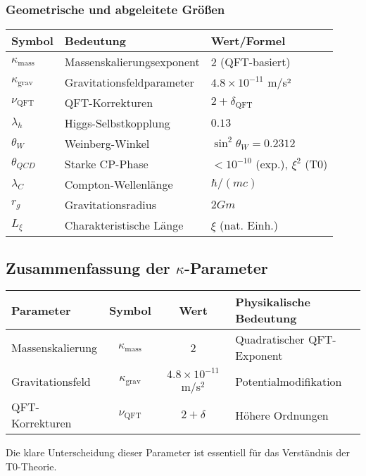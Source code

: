 \documentclass[12pt,a4paper]{article}
\begin{document}
	\subsubsection{Geometrische und abgeleitete Größen}
	\begin{longtable}{lll}
		\toprule
		\textbf{Symbol} & \textbf{Bedeutung} & \textbf{Wert/Formel} \\
		\midrule
		$\kappa_{\text{mass}}$ & Massenskalierungsexponent & $2$ (QFT-basiert) \\
		$\kappa_{\text{grav}}$ & Gravitationsfeldparameter & $4.8 \times 10^{-11}$ m/s² \\
		$\nu_{\text{QFT}}$ & QFT-Korrekturen & $2 + \delta_{\text{QFT}}$ \\
		$\lambda_h$ & Higgs-Selbstkopplung & $0.13$ \\
		$\theta_W$ & Weinberg-Winkel & $\sin^2\theta_W = 0.2312$ \\
		$\theta_{QCD}$ & Starke CP-Phase & $< 10^{-10}$ (exp.), $\xi^2$ (T0) \\
		$\lambda_C$ & Compton-Wellenlänge & $\hbar/(mc)$ \\
		$r_g$ & Gravitationsradius & $2Gm$ \\
		$L_\xi$ & Charakteristische Länge & $\xi$ (nat. Einh.) \\
		\bottomrule
	\end{longtable}
	
	\subsection{Zusammenfassung der $\kappa$-Parameter}
	
	\begin{center}
		\begin{tabular}{|l|c|c|l|}
			\hline
			\textbf{Parameter} & \textbf{Symbol} & \textbf{Wert} & \textbf{Physikalische Bedeutung} \\
			\hline
			Massenskalierung & $\kappa_{\text{mass}}$ & 2 & Quadratischer QFT-Exponent \\
			Gravitationsfeld & $\kappa_{\text{grav}}$ & $4.8 \times 10^{-11}$ m/s$^2$ & Potentialmodifikation \\
			QFT-Korrekturen & $\nu_{\text{QFT}}$ & $2 + \delta$ & Höhere Ordnungen \\
			\hline
		\end{tabular}
	\end{center}
	
	Die klare Unterscheidung dieser Parameter ist essentiell für das Verständnis der T0-Theorie.
	
\end{document}
